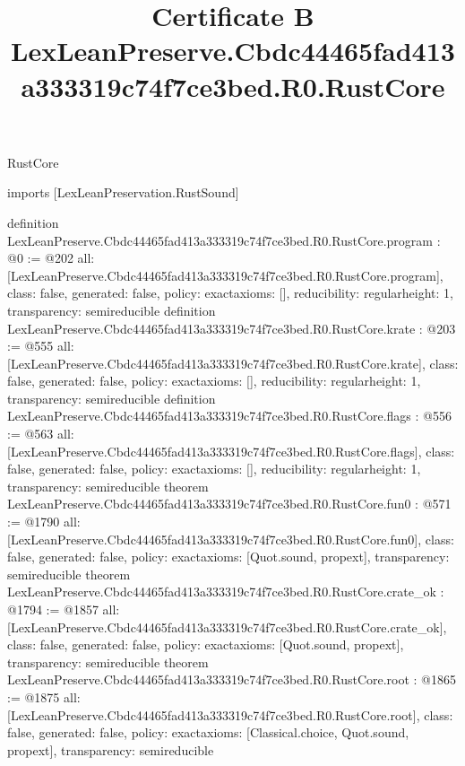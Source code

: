 \begin{lexlean}{RustCore}
\title{Certificate B LexLeanPreserve.Cbdc44465fad413a333319c74f7ce3bed.R0.RustCore}
\begin{coremodule}
imports [LexLeanPreservation.RustSound]

definition LexLeanPreserve.Cbdc44465fad413a333319c74f7ce3bed.R0.RustCore.program : @0 := @202 {
  all: [LexLeanPreserve.Cbdc44465fad413a333319c74f7ce3bed.R0.RustCore.program],
  class: false,
  generated: false,
  policy: exact{axioms: []},
  reducibility: regular{height: 1},
  transparency: semireducible
}
definition LexLeanPreserve.Cbdc44465fad413a333319c74f7ce3bed.R0.RustCore.krate : @203 := @555 {
  all: [LexLeanPreserve.Cbdc44465fad413a333319c74f7ce3bed.R0.RustCore.krate],
  class: false,
  generated: false,
  policy: exact{axioms: []},
  reducibility: regular{height: 1},
  transparency: semireducible
}
definition LexLeanPreserve.Cbdc44465fad413a333319c74f7ce3bed.R0.RustCore.flags : @556 := @563 {
  all: [LexLeanPreserve.Cbdc44465fad413a333319c74f7ce3bed.R0.RustCore.flags],
  class: false,
  generated: false,
  policy: exact{axioms: []},
  reducibility: regular{height: 1},
  transparency: semireducible
}
theorem LexLeanPreserve.Cbdc44465fad413a333319c74f7ce3bed.R0.RustCore.fun0 : @571 := @1790 {
  all: [LexLeanPreserve.Cbdc44465fad413a333319c74f7ce3bed.R0.RustCore.fun0],
  class: false,
  generated: false,
  policy: exact{axioms: [Quot.sound, propext]},
  transparency: semireducible
}
theorem LexLeanPreserve.Cbdc44465fad413a333319c74f7ce3bed.R0.RustCore.crate_ok : @1794 := @1857 {
  all: [LexLeanPreserve.Cbdc44465fad413a333319c74f7ce3bed.R0.RustCore.crate_ok],
  class: false,
  generated: false,
  policy: exact{axioms: [Quot.sound, propext]},
  transparency: semireducible
}
theorem LexLeanPreserve.Cbdc44465fad413a333319c74f7ce3bed.R0.RustCore.root : @1865 := @1875 {
  all: [LexLeanPreserve.Cbdc44465fad413a333319c74f7ce3bed.R0.RustCore.root],
  class: false,
  generated: false,
  policy: exact{axioms: [Classical.choice, Quot.sound, propext]},
  transparency: semireducible
}


\end{coremodule}
\end{lexlean}
